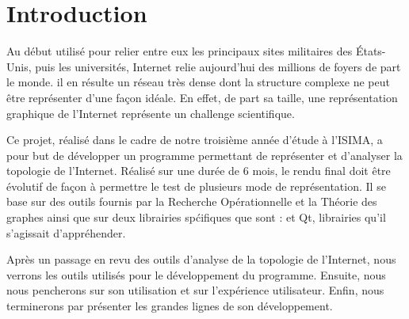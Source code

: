\section*{Introduction}

\par
Au d\'ebut utilis\'e pour relier entre eux les principaux sites militaires des \'Etats-Unis, puis les universit\'es, Internet relie aujourd'hui des millions de foyers de part le monde. il en r\'esulte un r\'eseau tr\`es dense dont la structure complexe ne peut \^etre repr\'esenter d'une fa\c con id\'eale. En effet, de part sa taille, une repr\'esentation graphique de l'Internet repr\'esente un challenge scientifique.
\par
Ce projet, r\'ealis\'e dans le cadre de notre troisi\`eme ann\'ee d'\'etude \`a l'ISIMA, a pour but de d\'evelopper un programme permettant de repr\'esenter et d'analyser la topologie de l'Internet. R\'ealis\'e sur une dur\'ee de 6 mois, le rendu final doit \^etre \'evolutif de fa\c con \`a permettre le test de plusieurs mode de repr\'esentation.
Il se base sur des outils fournis par la Recherche Op\'erationnelle et la Th\'eorie des graphes ainsi que sur deux librairies sp\'cifiques que sont : \boost et Qt, librairies qu'il s'agissait d'appr\'ehender.
\par
Apr\`es un passage en revu des outils d'analyse de la topologie de l'Internet, nous verrons les outils utilis\'es pour le d\'eveloppement du programme. Ensuite, nous nous pencherons sur son utilisation et sur l'exp\'erience utilisateur. Enfin, nous terminerons par pr\'esenter les grandes lignes de son d\'eveloppement.

